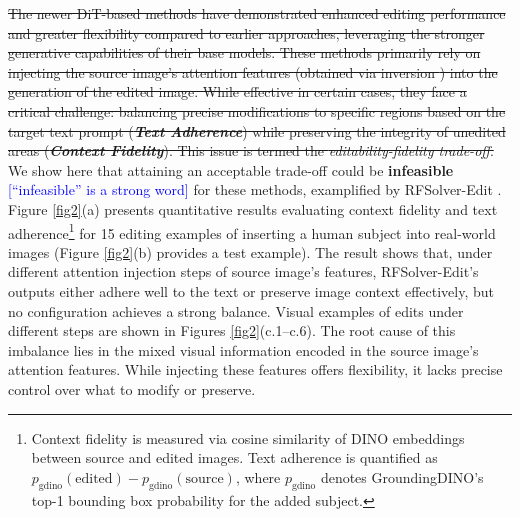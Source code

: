 \documentclass{article}
\newcommand{\kc}[1]{\textcolor{blue}{#1}}
\begin{document}
\sout{The newer DiT-based methods have demonstrated enhanced editing performance and greater flexibility compared to earlier approaches, leveraging the stronger generative capabilities of their base models. These methods primarily rely on injecting the source image's attention features (obtained via inversion \citep{deng2024fireflow,rout2024semantic,wang2024taming}) into the generation of the edited image. While effective in certain cases, they face a critical challenge: balancing precise modifications to specific regions based on the target text prompt (\textbf{\textit{Text Adherence}}) while preserving the integrity of unedited areas (\textbf{\textit{Context Fidelity}}). This issue is termed the \textit{editability-fidelity trade-off}.}
We show here that attaining an acceptable trade-off could be \textbf{infeasible} \kc{[``infeasible'' is a strong word]} for these methods, examplified by RFSolver-Edit \citep{wang2024taming}. Figure \ref{fig2}(a) presents quantitative results evaluating context fidelity and text adherence\footnote{Context fidelity is measured via cosine similarity of DINO embeddings \citep{caron2021emerging} between source and edited images. Text adherence is quantified as \( p_{\text{gdino}}(\text{edited}) - p_{\text{gdino}}(\text{source}) \), where \( p_{\text{gdino}} \) denotes GroundingDINO's \citep{liu2024grounding} top-1 bounding box probability for the added subject.} for 15 editing examples of inserting a human subject into real-world images (Figure \ref{fig2}(b) provides a test example). The result shows that, under different attention injection steps of source image's features, RFSolver-Edit's outputs either adhere well to the text or preserve image context effectively, but no configuration achieves a strong balance. Visual examples of edits under different steps are shown in Figures \ref{fig2}(c.1–c.6). The root cause of this imbalance lies in the mixed visual information encoded in the source image's attention features. While injecting these features offers flexibility, it lacks precise control over what to modify or preserve.

\end{document}
